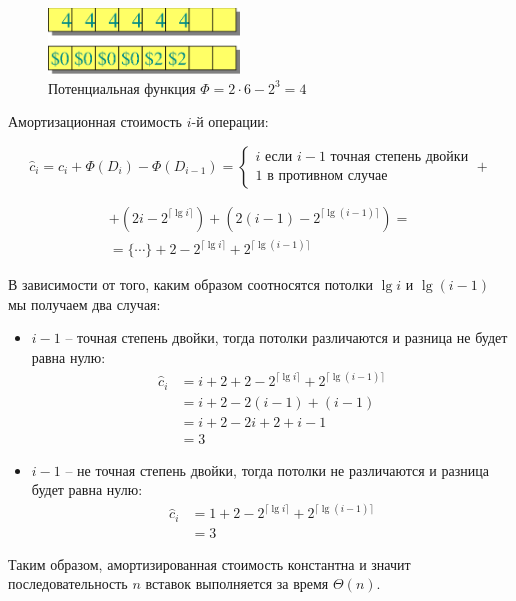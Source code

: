 \documentclass[a4paper,11pt]{article}
\begin{document}
\begin{figure}[ht]
  \centering
  \includegraphics[width=2in]{lecture13/potentials.eps}
  \caption{Потенциальная функция $\Phi = 2 \cdot 6 - 2^3 = 4$}
  \label{fig:potentials}
\end{figure}

Амортизационная стоимость $i$-й операции:

$$
\hat{c}_i = c_i + \Phi(D_i) - \Phi(D_{i-1}) = 
\begin{cases}
  i \text{ если } i - 1 \text { точная степень двойки} \\
  1 \text{ в противном случае }
\end{cases} + 
$$

\begin{gather*}
+ (2i - 2^{\lceil \lg i \rceil})
+ (2(i-1) - 2^{\lceil \lg (i-1) \rceil}) =\\
= \lbrace \cdots \rbrace + 2 - 2^{\lceil \lg i \rceil} + 2 ^{\lceil \lg (i-1)
  \rceil}
\end{gather*}

В зависимости от того, каким образом соотносятся потолки $\lg i$  и $\lg(i-1)$
мы получаем два случая:

\begin{itemize}
\item $i - 1$ -- точная степень двойки, тогда потолки различаются и разница не
  будет равна нулю:
  \begin{align*}
    \hat{c}_i &= i + 2 + 2 - 2^{\lceil \lg i \rceil} + 2 ^{\lceil \lg (i-1)  \rceil} \\
    &= i + 2 - 2(i - 1) + (i - 1) \\
    &= i + 2 - 2i + 2 + i - 1 \\
    &= 3
  \end{align*}
\item $i - 1$ -- не точная степень двойки, тогда потолки не различаются и разница
  будет равна нулю:
  \begin{align*}
    \hat{c}_i &= 1 + 2 - 2^{\lceil \lg i \rceil} + 2 ^{\lceil \lg (i-1)  \rceil} \\
    &= 3
  \end{align*}
\end{itemize}

Таким образом, амортизированная стоимость константна и значит последовательность
$n$ вставок выполняется за время $\Theta(n)$.
\end{document}
